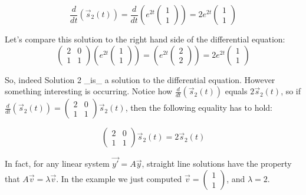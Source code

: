\documentclass[
]{book}
\theoremstyle{definition}
\theoremstyle{definition}
\theoremstyle{definition}
\theoremstyle{remark}
\begin{document}
\begin{equation}
\frac{d}{dt} \left( \vec{s}_{2}(t)  \right) = \frac{d}{dt} \left( e^{2t}  \begin{pmatrix} 1 \\ 1\end{pmatrix} \right) = 2 e^{2t}  \begin{pmatrix} 1 \\ 1\end{pmatrix}
\end{equation}


Let's compare this solution to the right hand side of the differential equation:
\begin{equation}
\begin{pmatrix} 2 & 0 \\ 1 &  1 \end{pmatrix} \left( e^{2t}  \begin{pmatrix} 1 \\ 1\end{pmatrix} \right) = \left( e^{2t}  \begin{pmatrix} 2 \\ 2 \end{pmatrix} \right) =  2 e^{2t}  \begin{pmatrix} 1 \\ 1\end{pmatrix}
\end{equation}

So, indeed Solution 2 _is_ a solution to the differential equation.  However something interesting is occurring. Notice how $\displaystyle \frac{d}{dt} \left( \vec{s}_{2}(t)  \right)$ equals $2 \vec{s}_{2}(t)$, so if $\displaystyle \frac{d}{dt} \left( \vec{s}_{2}(t)  \right) = \begin{pmatrix} 2 & 0 \\ 1 &  1 \end{pmatrix} \vec{s}_{2}(t)$, then the following equality has to hold:

\begin{equation}
 \begin{pmatrix} 2 & 0 \\ 1 &  1 \end{pmatrix} \vec{s}_{2}(t) = 2 \vec{s}_{2}(t)
 \end{equation}
 
In fact, for any linear system $\vec{y'}=A\vec{y}$, straight line solutions have the property that $\displaystyle A \vec{v} = \lambda \vec{v}$. In the example we just computed $\displaystyle \vec{v} = \begin{pmatrix} 1 \\ 1\end{pmatrix}$, and $\lambda = 2$.
\end{document}
